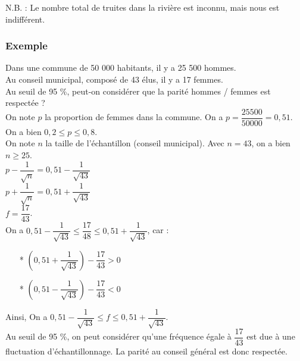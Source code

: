 N.B. : Le nombre total de truites dans la rivière est inconnu, mais nous est indifférent. \\

\newpage

\subsubsection{Exemple }

Dans une commune de 50 000 habitants, il y a 25 500 hommes. \\ Au conseil municipal, composé de 43 élus, il y a 17 femmes. \\ Au seuil de 95  \%, peut-on considérer que la parité hommes / femmes est respectée ? \\

On note $p$ la proportion de femmes dans la commune. On a $p = \dfrac{25500}{50 000} = 0,51$. On a bien $0,2\leq p \leq 0,8$. \\

On note $n$ la taille de l'échantillon (conseil municipal). Avec $n = 43$, on a bien $n \geq 25$. \\

$ p - \dfrac{1}{\sqrt{n}} = 0, 51- \dfrac{1}{\sqrt{43}} $ \\

$ p + \dfrac{1}{\sqrt{n}} = 0, 51 + \dfrac{1}{\sqrt{43}}  $ \\

$ f = \dfrac{17}{43} $. \\

On a $ 0,51 - \dfrac{1}{\sqrt{43}} \leq \dfrac{17}{48} \leq 0,51 + \dfrac{1}{\sqrt{43}} $, car : \\

\begin{itemize}
\item[*] $ \left(0,51 + \dfrac{1}{\sqrt{43}}\right) - \dfrac{17}{43} > 0  $
\item[*] $ \left(0,51 - \dfrac{1}{\sqrt{43}}\right) - \dfrac{17}{43} < 0 $
\end{itemize}

\vspace{.3cm}

Ainsi, On a $ 0,51 - \dfrac{1}{\sqrt{43}} \leq f \leq 0,51 + \dfrac{1}{\sqrt{43}} $. \\

Au seuil de 95  \%, on peut considérer qu'une fréquence égale à $\dfrac{17}{43}$ est due à une fluctuation d'échantillonnage. La parité au conseil général est donc respectée. 

